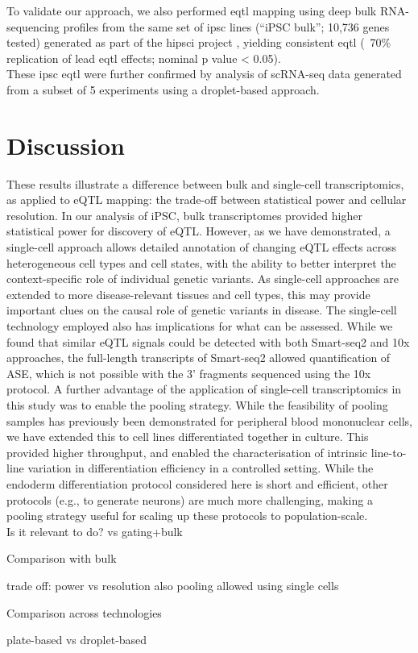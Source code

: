 To validate our approach, we also performed \gls{eqtl} mapping using deep bulk RNA-sequencing profiles from the same set of \gls{ipsc} lines (“iPSC bulk”; 10,736 genes tested) generated as part of the \gls{hipsci} project \cite{kilpinen2017common}, yielding consistent \gls{eqtl} (~70\% replication of lead \gls{eqtl} effects; nominal p value < 0.05).\\ 

These \gls{ipsc} \gls{eqtl} were further confirmed by analysis of scRNA-seq data generated from a subset of 5 experiments using a droplet-based approach.



\section{Discussion}

These results illustrate a difference between bulk and single-cell transcriptomics, as applied to eQTL mapping: the trade-off between statistical power and cellular resolution. 
In our analysis of iPSC, bulk transcriptomes provided higher statistical power for
discovery of eQTL. 
However, as we have demonstrated, a single-cell approach allows detailed annotation of changing eQTL effects across heterogeneous cell types and cell states, with the ability to better interpret the context-specific role of individual genetic
variants. 
As single-cell approaches are extended to more disease-relevant tissues and cell types, this may provide important clues on the causal role of genetic variants in disease. 
The single-cell technology employed also has implications for what can be assessed. 
While we found that similar eQTL signals could be detected with both Smart-seq2 and 10x approaches, the full-length transcripts of Smart-seq2 allowed quantification of ASE, which is not possible with the 3' fragments sequenced using the 10x protocol.
A further advantage of the application of single-cell transcriptomics in this study was to enable the pooling strategy. 
While the feasibility of pooling samples has previously been demonstrated for peripheral blood mononuclear cells\cite{kang2018multiplexed}, we have extended this to cell lines differentiated together in culture. 
This provided higher throughput, and enabled the characterisation of intrinsic line-to-line variation in differentiation efficiency in a controlled setting. 
While the endoderm differentiation protocol considered here is short and efficient, other protocols (e.g., to generate neurons\cite{tao2016neural}) are much more challenging, making a pooling strategy useful for scaling up these protocols to population-scale.\\


Is it relevant to do? 
vs gating+bulk


Comparison with bulk

trade off: power vs resolution
also pooling allowed using single cells

Comparison across technologies

plate-based vs droplet-based

